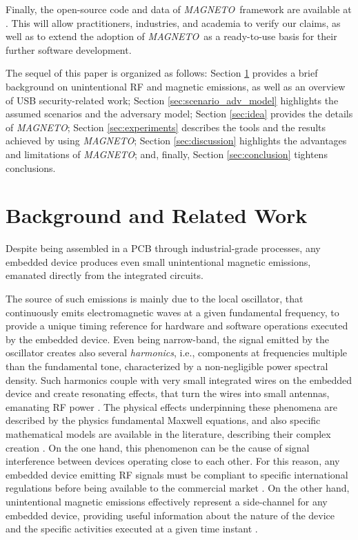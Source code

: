 \documentclass[acmsmall, authorversion]{acmart}
\newcommand{\sol}{\emph{MAGNETO}}
\begin{document}
Finally, the open-source code and data of \sol\ framework are available at \cite{crilab}.
This will allow practitioners, industries, and academia to verify our claims, as well as to extend the adoption of \sol\ as a ready-to-use basis for their further software development.

The sequel of this paper is organized as follows: Section \ref{sec:background_related} provides a brief background on unintentional RF and magnetic emissions, as well as an overview of USB security-related work; Section \ref{sec:scenario_adv_model} highlights the assumed scenarios and the adversary model; Section \ref{sec:idea} provides the details of \sol; Section \ref{sec:experiments} describes the tools and the results achieved by using \sol; Section \ref{sec:discussion} highlights the advantages and limitations of \sol; and, finally, Section \ref{sec:conclusion} tightens conclusions.

\section{Background and Related Work}
\label{sec:background_related}

Despite being assembled in a \ac{PCB} through industrial-grade processes, any embedded device produces even small unintentional magnetic emissions, emanated directly from the integrated circuits. 

The source of such emissions is mainly due to the local oscillator, that continuously emits electromagnetic waves at a given fundamental frequency, to provide a unique timing reference for hardware and software operations executed by the embedded device. Even being narrow-band, the signal emitted by the oscillator creates also several \emph{harmonics}, i.e., components at frequencies multiple than the fundamental tone, characterized by a non-negligible power spectral density. Such harmonics couple with very small integrated wires on the embedded device and create resonating effects, that turn the wires into small antennas, emanating RF power \cite{Acharya2013}. The physical effects underpinning these phenomena are described by the physics fundamental Maxwell equations, and also specific mathematical models are available in the literature, describing their complex creation \cite{bole2009}. On the one hand, this phenomenon can be the cause of signal interference between devices operating close to each other. For this reason, any embedded device emitting RF signals must be compliant to specific international regulations before being available to the commercial market \cite{fcc}. 
On the other hand, unintentional magnetic emissions effectively represent a side-channel for any embedded device, providing useful information about the nature of the device and the specific activities executed at a given time instant \cite{Dejean2007}.
\end{document}
